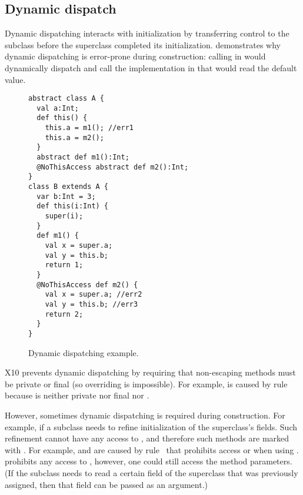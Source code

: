 \subsection{Dynamic dispatch}
Dynamic dispatching interacts with initialization by transferring control to the subclass
    before the superclass completed its initialization.
 demonstrates why dynamic dispatching is error-prone during construction:
    calling  in  would dynamically dispatch and
    call the implementation in 
    that would read the default value.



\begin{figure}
\begin{lstlisting}
abstract class A {
  val a:Int;
  def this() {
    this.a = m1(); //err1
    this.a = m2();
  }
  abstract def m1():Int;
  @NoThisAccess abstract def m2():Int;
}
class B extends A {
  var b:Int = 3;
  def this(i:Int) {
    super(i);
  }
  def m1() {
    val x = super.a;
    val y = this.b;
    return 1;
  }
  @NoThisAccess def m2() {
    val x = super.a; //err2
    val y = this.b; //err3
    return 2;
  }
}
\end{lstlisting}
\caption{Dynamic dispatching example.
    }
\label{Figure:Dynamic-dispatch}
\end{figure}


X10 prevents dynamic dispatching by requiring that non-escaping methods
    must be private or final
    (so overriding is impossible).
For example,  is caused by rule~
    because  is neither private nor final nor .

However, sometimes dynamic dispatching is required during construction.
For example, if a subclass needs to refine initialization
    of the superclass's fields.
Such refinement cannot have any access to \this, and therefore
    such methods are marked with .
For example,  and  are caused by rule~ that prohibits access \this or 
    when using .
 prohibits any access to \this,
    however, one could still access the method parameters.
(If the subclass needs to read a certain field of the superclass that was previously assigned,
    then that field can be passed as an argument.) %


